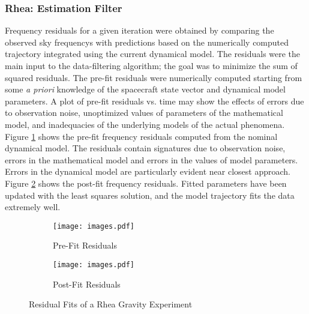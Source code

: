 \documentclass{article}
\begin{document}
            \subsubsection{\footnotesize Rhea: Estimation Filter}
                Frequency residuals for a given iteration were obtained
                by comparing the observed \glspl{sky frequency} with
                predictions based on the numerically computed trajectory
                integrated using the current dynamical model. The residuals
                were the main input to the data-filtering algorithm; the
                goal was to minimize the sum of squared residuals. The
                pre-fit residuals were numerically computed starting from
                some \textit{a priori} knowledge of the spacecraft state
                vector and dynamical model parameters. A plot of pre-fit
                residuals vs. time may show the effects of errors due to
                observation noise, unoptimized values of parameters of the
                mathematical model, and inadequacies of the underlying
                models of the actual phenomena.
                Figure \ref{fig:usr_pre_fit_rhea_grav_exp} shows the
                pre-fit frequency residuals computed from the nominal
                dynamical model. The residuals contain signatures due to
                observation noise, errors in the mathematical model and
                errors in the values of model parameters. Errors in the
                dynamical model are particularly evident near closest
                approach. Figure \ref{fig:usr_post_fit_rhea_grav_exp} shows
                the post-fit frequency residuals. Fitted parameters have
                been updated with the least squares solution, and the model
                trajectory fits the  data
                extremely well.
            \begin{figure}[H]
            	\centering
            	\captionsetup{type=figure}
            	\begin{subfigure}[b]{0.48\textwidth}
            	    \texttt{[image: images.pdf]}
            	    \caption{\scriptsize Pre-Fit Residuals}
            	    \label{fig:usr_pre_fit_rhea_grav_exp}
                \end{subfigure}
                \begin{subfigure}[b]{0.5\textwidth}
                    \texttt{[image: images.pdf]}
                    \caption{\scriptsize Post-Fit Residuals}
                    \label{fig:usr_post_fit_rhea_grav_exp}
                \end{subfigure}
                    \caption{Residual Fits of a Rhea Gravity Experiment}
                    \label{fig:usr_rhea_grav_exp}
            \end{figure}
            
\end{document}
